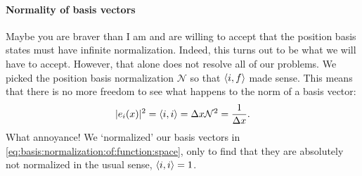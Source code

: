 \paragraph{Normality of basis vectors} Maybe you are braver than I am and are willing to accept that the position basis states must have infinite normalization. Indeed, this turns out to be what we will have to accept. However, that alone does not resolve all of our problems. We picked the position basis normalization $\mathcal N$ so that $\langle i, f\rangle$ made sense. This means that there is no more freedom to see what happens to the norm of a basis vector:
\begin{align}
    |e_i(x)|^2 = \langle i , i \rangle = \Delta x \mathcal N^2 = \frac{1}{\Delta x}.
\end{align}
What annoyance! We `normalized' our basis vectors in \eqref{eq:basis:normalization:of:function:space}, only to find that they are absolutely not normalized in the usual sense, $\langle i, i \rangle = 1$. 










